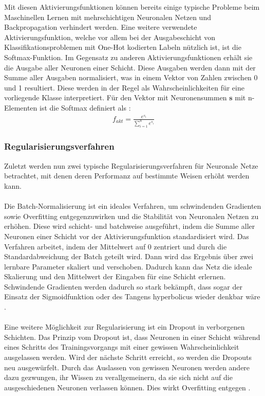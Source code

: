 \documentclass[11pt,bibliography=totocnumbered]{scrartcl}
\newcommand{\myequations}[1]{%
\addcontentsline{equ}{myequations}{\protect\numberline{\theequation}#1}}
\begin{document}
Mit diesen Aktivierungsfunktionen können bereits einige typische Probleme beim Maschinellen Lernen mit mehrschichtigen Neuronalen Netzen und Backpropagation verhindert werden. Eine weitere verwendete Aktivierungsfunktion, welche vor allem bei der Ausgabeschicht von Klassifikationsproblemen mit One-Hot kodierten Labeln nützlich ist, ist die Softmax-Funktion. Im Gegensatz zu anderen Aktivierungsfunktionen erhält sie die Ausgabe aller Neuronen einer Schicht. Diese Ausgaben werden dann mit der Summe aller Ausgaben normalisiert, was in einem Vektor von Zahlen zwischen 0 und 1 resultiert. Diese werden in der Regel als Wahrscheinlichkeiten für eine vorliegende Klasse interpretiert. Für den Vektor mit Neuronensummen \ensuremath{\textbf{s}} mit n-Elementen ist die Softmax definiert als \cite[S.37]{BA}\cite[S.141-142, S.263]{MACHINE_LEARNING}: 
\begin{equation}
\label{eq:softmax}
\begin{aligned}
f_{akt} = \frac{e^{s_i}}{\sum_{i=1}^{n}e^{s_i}}
\end{aligned}
\end{equation}\myequations{Softmax}
\subsubsection{Regularisierungsverfahren}
Zuletzt werden nun zwei typische Regularisierungsverfahren für Neuronale Netze betrachtet, mit denen deren Performanz auf bestimmte Weisen erhöht werden kann.
\\\\
Die Batch-Normalisierung ist ein ideales Verfahren, um schwindenden Gradienten sowie Overfitting entgegenzuwirken und die Stabilität von Neuronalen Netzen zu erhöhen. Diese wird schicht- und batchweise ausgeführt, indem die Summe aller Neuronen einer Schicht vor der Aktivierungsfunktion standardisiert wird. Das Verfahren arbeitet, indem der Mittelwert auf 0 zentriert und durch die Standardabweichung der Batch geteilt wird. Dann wird das Ergebnis über zwei lernbare Parameter skaliert und verschoben. Dadurch kann das Netz die ideale Skalierung und den Mittelwert der Eingaben für eine Schicht erlernen. Schwindende Gradienten werden dadurch so stark bekämpft, dass sogar der Einsatz der Sigmoidfunktion oder des Tangens hyperbolicus wieder denkbar wäre \cite[S.37-38]{BA}\cite[S.282-283]{MACHINE_LEARNING}.
\\\\
Eine weitere Möglichkeit zur Regularisierung ist ein Dropout in verborgenen Schichten. Das Prinzip vom Dropout ist, dass Neuronen in einer Schicht während eines Schritts des Trainingsvorgangs mit einer gewissen Wahrscheinlichkeit ausgelassen werden. Wird der nächste Schritt erreicht, so werden die Dropouts neu ausgewürfelt. Durch das Auslassen von gewissen Neuronen werden andere dazu gezwungen, ihr Wissen zu verallgemeinern, da sie sich nicht auf die ausgeschiedenen Neuronen verlassen können. Dies wirkt Overfitting entgegen \cite[S.38-39]{BA}\cite[S.205-206]{NNP}.
\end{document}
